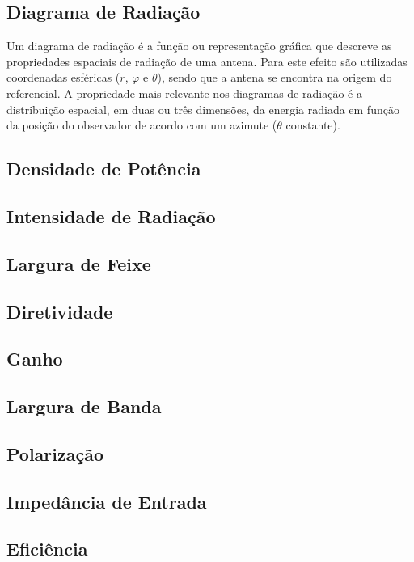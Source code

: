 \subsection*{Diagrama de Radiação}
Um diagrama de radiação é a função ou representação gráfica que descreve as propriedades espaciais de radiação de uma antena. Para este efeito são utilizadas coordenadas esféricas ($r$, $\varphi$ e $\theta$), sendo que a antena se encontra na origem do referencial. A propriedade mais relevante nos diagramas de radiação é a distribuição espacial, em duas ou três dimensões, da energia radiada em função da posição do observador de acordo com um azimute ($\theta$ constante).

\subsection*{Densidade de Potência}


\subsection*{Intensidade de Radiação}


\subsection*{Largura de Feixe}


\subsection*{Diretividade}


\subsection*{Ganho}


\subsection*{Largura de Banda}


\subsection*{Polarização}


\subsection*{Impedância de Entrada}


\subsection*{Eficiência}
